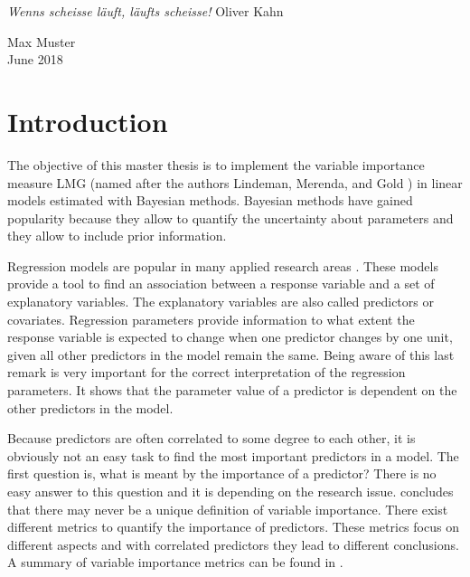 \documentclass[11pt,a4paper,twoside]{book}\usepackage[]{graphicx}\usepackage[]{color}
\begin{document}
\textit{Wenns scheisse l\"auft, l\"aufts scheisse!} Oliver Kahn

\bigskip

\begin{flushright}
Max Muster\\
June 2018
\end{flushright}


\cleardoublepage
{}












\chapter{Introduction}

The objective of this master thesis is to implement the variable importance measure LMG (named after the authors Lindeman, Merenda, and Gold \citep{Gromping2007}) in linear models estimated with Bayesian methods. Bayesian methods have gained popularity because they allow to quantify the uncertainty about parameters and they allow to include prior information.

Regression models are popular in many applied research areas \citep{Nimon2013}. These models provide a tool to find an association between a response variable and a set of explanatory variables. The explanatory variables are also called predictors or covariates. Regression parameters provide information to what extent the response variable is expected to change when one predictor changes by one unit, given all other predictors in the model remain the same. Being aware of this last remark is very important for the correct interpretation of the regression parameters. It shows that the parameter value of a predictor is dependent on the other predictors in the model.

Because predictors are often correlated to some degree to each other, it is obviously not an easy task to find the most important predictors in a model. The first question is, what is meant by the importance of a predictor? There is no easy answer to this question and it is depending on the research issue. \cite{Gromping2015} concludes that there may never be a unique definition of variable importance. There exist different metrics to quantify the importance of predictors. These metrics focus on different aspects and with correlated predictors they lead to different conclusions.  A summary of variable importance metrics can be found in  \cite{Gromping2015}.  
\end{document}
